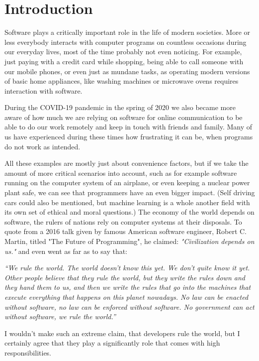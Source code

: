 \chapter{Introduction}

Software plays a critically important role in the life of modern societies. More or less everybody interacts with computer programs on countless occasions during our everyday lives, most of the time probably not even noticing. For example, just paying with a credit card while shopping, being able to call someone with our mobile phones, or even just as mundane tasks, as operating modern versions of basic home appliances, like washing machines or microwave ovens requires interaction with software.


During the COVID-19 pandemic in the spring of 2020 we also became more aware of how much we are relying on software for online communication to be able to do our work remotely and keep in touch with friends and family. Many of us have experienced during these times how frustrating it can be, when programs do not work as intended.

All these examples are mostly just about convenience factors, but if we take the amount of more critical scenarios into account, such as for example software running on the computer system of an airplane, or even keeping a nuclear power plant safe, we can see that programmers have an even bigger impact. (Self driving cars could also be mentioned, but machine learning is a whole another field with its own set of ethical and moral questions.) The economy of the world depends on software, the rulers of nations rely on computer systems at their disposals. To quote from a 2016 talk given by famous American software engineer, Robert C. Martin, titled "The Future of Programming", he claimed: \textit{"Civilization depends on us."} and even went as far as to say that:

\textit{``We rule the world. The world doesn't know this yet. We don't quite know it yet. Other people believe that they rule the world, but they write the rules down and they hand them to us, and then we write the rules that go into the machines that execute everything that happens on this planet nowadays. No law can be enacted without software, no law can be enforced without software. No government can act without software, we rule the world.''}

I wouldn't make such an extreme claim, that developers rule the world, but I certainly agree that they play a significantly role that comes with high responsibilities.

